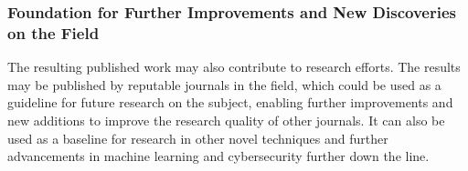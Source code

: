 \documentclass[a4paper, 12pt]{article}
\begin{document}
\subsubsection{ Foundation for Further Improvements and New Discoveries on the Field }

The resulting published work may also contribute to research efforts. The results may be published by reputable journals in the field, which could be used as a guideline for future research on the subject, enabling further improvements and new additions to improve the research quality of other journals. It can also be used as a baseline for research in other novel techniques and further advancements in machine learning and cybersecurity further down the line.

\clearpage


{}
\end{document}
